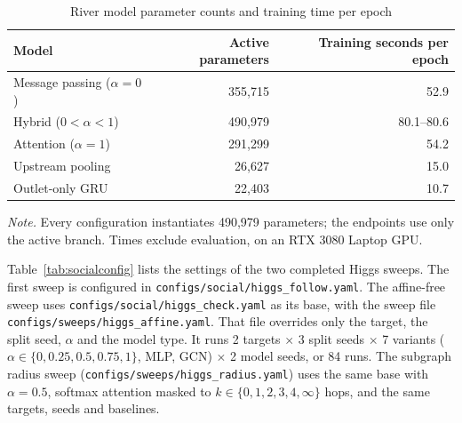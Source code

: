 \begin{table}[H]
\caption{River model parameter counts and training time per epoch}
\label{tab:rivercost}
\centering\small
\begin{tabular}{@{}lrr@{}}
\toprule
Model & Active parameters & Training seconds per epoch \\
\midrule
Message passing ($\alpha=0$) & 355,715 & 52.9 \\
Hybrid ($0<\alpha<1$) & 490,979 & 80.1--80.6 \\
Attention ($\alpha=1$) & 291,299 & 54.2 \\
Upstream pooling & 26,627 & 15.0 \\
Outlet-only GRU & 22,403 & 10.7 \\
\bottomrule
\end{tabular}

\vspace{4pt}
\parbox{0.85\textwidth}{\footnotesize\textit{Note.} Every configuration instantiates 490,979 parameters; the endpoints use only the active branch. Times exclude evaluation, on an RTX 3080 Laptop GPU.}
\end{table}

Table~\ref{tab:socialconfig} lists the settings of the two completed Higgs sweeps. The first sweep is configured in \nolinkurl{configs/social/higgs_follow.yaml}. The affine-free sweep uses \nolinkurl{configs/social/higgs_check.yaml} as its base, with the sweep file \nolinkurl{configs/sweeps/higgs_affine.yaml}. That file overrides only the target, the split seed, $\alpha$ and the model type. It runs 2 targets $\times$ 3 split seeds $\times$ 7 variants ($\alpha\in\{0,0.25,0.5,0.75,1\}$, MLP, GCN) $\times$ 2 model seeds, or 84 runs. The subgraph radius sweep (\nolinkurl{configs/sweeps/higgs_radius.yaml}) uses the same base with $\alpha=0.5$, softmax attention masked to $k\in\{0,1,2,3,4,\infty\}$ hops, and the same targets, seeds and baselines.

